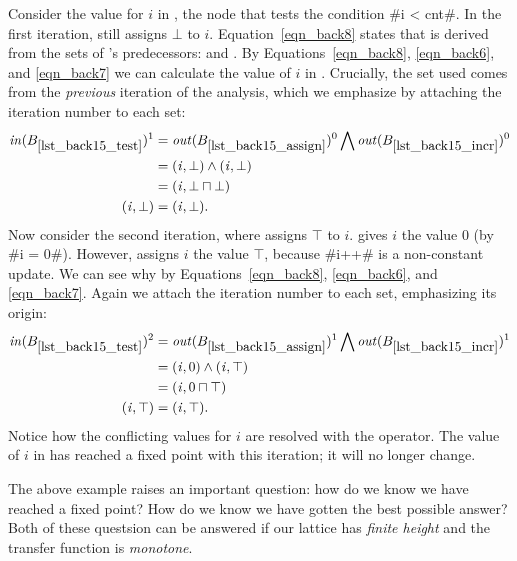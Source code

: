 \documentclass[12pt]{report}
\begin{document}
Consider the value for $i$ in , the node that
tests the condition #i < cnt#. In the first iteration,
 still assigns $\bot$ to
$i$. Equation~\eqref{eqn_back8} states that  is
derived from the \out sets of 's
predecessors:  and
. By Equations~\eqref{eqn_back8},
\eqref{eqn_back6}, and \eqref{eqn_back7} we can calculate the value of
$i$ in . Crucially, the \out set used comes from
the \emph{previous} iteration of the analysis, which we emphasize by
attaching the iteration number to each set:
\begin{align*}
  \inB{lst_back15_test}^1 &= \outB{lst_back15_assign}^0 \bigwedge \outB{lst_back15_incr}^0 \\
  &= {\factC{i}{\bot}} \wedge {\factC{i}{\bot}} \\
  &= {\factC{i}{\bot \lub \bot}} \\
  {\factC{i}{\bot}} &= {\factC{i}{\bot}}.
\end{align*}
Now consider the second iteration, where  assigns
$\top$ to $i$.  gives $i$ the value
0 (by #i = 0#). However,  assigns $i$ the value $\top$,
because #i++# is a non-constant update. We can see why by
Equations~\eqref{eqn_back8}, \eqref{eqn_back6}, and
\eqref{eqn_back7}. Again we attach the iteration number to each set,
emphasizing its origin:
\begin{align*}
  \inB{lst_back15_test}^2 &= \outB{lst_back15_assign}^1 \bigwedge \outB{lst_back15_incr}^1 \\
  &= {\factC{i}{0}} \wedge {\factC{i}{\top}} \\
  &= {\factC{i}{0 \lub \top}} \\
  {\factC{i}{\top}} &= {\factC{i}{\top}}.
\end{align*}
Notice how the conflicting values for $i$ are resolved with the \lub
operator. The value of $i$ in  has reached a fixed point
with this iteration; it will no longer change.

The above example raises an important question: how do we know we have
reached a fixed point? How do we know we have gotten the best possible
answer?  Both of these questsion can be answered if our lattice has
\emph{finite height} and the transfer function is \emph{monotone}.
\end{document}
